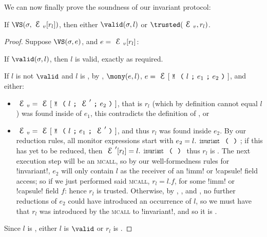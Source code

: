 \setcounter{theorem}{0}\LS
We can now finally prove the soundness of our invariant protocol:
\SS
\begin{theorem}[Soundness]\rm
If $\VS(\s, \EV[r_l])$, then either $\valid(\s,l)$ or $\trusted(\EV,r_l)$.
\end{theorem}\SS
\begin{proof}
\noindent Suppose $\VS(\s, e)$, and $e = \EV[r_l]$:
\begin{ienumerate}
	\item If $\valid(\s,l)$, then $l$ is valid, exactly as required.
	\item If $l$ is not $\valid$ and $l$ is \reach, by , $\mony(e,l)$, $e = \E[\M{l}{e_1}{e_2}]$, and either:
	\begin{itemize}
	 \item $\EV = \E[\M{l}{\E'}{e_2}]$, that is $r_l$ (which by definition cannot equal $l$) was found inside of $e_1$, this contradicts the definition of \mony, or
	 \item $\EV = \E[\M{l}{e_1}{\E'}]$, and thus $r_l$ was found inside $e_2$. By our reduction rules, all monitor expressions start with $e_2=l.\invariant$; if this has yet to be reduced, then $\E'[r_l] = l.\invariant$ thus $r_l$ is \trusted. The next execution step will be an \textsc{mcall}, so by our well-formedness rules for \Q!invariant!, $e_2$ will only contain $l$ as the receiver of an \Q!imm! or \Q!capsule! field access; so if we just performed said \textsc{mcall}, $r_l = l.f$, for some \Q!imm! or \Q!capsule! field $f$: hence $r_l$ is trusted. Otherwise, by , , and \HNC, no further reductions of $e_2$ could have introduced an occurrence of $l$, so we must have that $r_l$ was introduced by the \textsc{mcall} to \Q!invariant!, and so it is \trusted.
	\end{itemize}
\end{ienumerate}
Since $l$ is \reach, either $l$ is $\valid$ or $r_l$ is \trusted.
\end{proof}